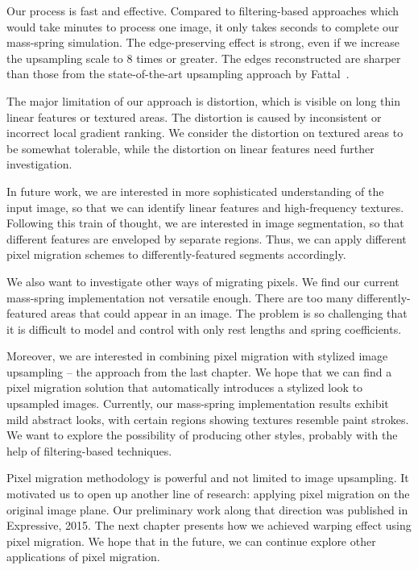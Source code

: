 Our process is fast and effective. Compared to filtering-based approaches which would take minutes to process one image, it only takes seconds to complete our mass-spring simulation. The edge-preserving effect is strong, even if we increase the upsampling scale to 8 times or greater. The edges reconstructed are sharper than those from the state-of-the-art upsampling approach by Fattal~\cite{FAT:EdgeStatistics}.

 The major limitation of our approach is distortion, which is visible on long thin linear features or textured areas. The distortion is caused by inconsistent or incorrect local gradient ranking. We consider the distortion on textured areas to be somewhat tolerable, while the distortion on linear features need further investigation. 
 
In future work, we are interested in more sophisticated understanding of the input image, so that we can identify linear features and high-frequency textures. Following this train of thought, we are interested in image segmentation, so that different features are enveloped by separate regions. Thus, we can apply different pixel migration schemes to differently-featured segments accordingly. 

We also want to investigate other ways of migrating pixels. We find our current mass-spring implementation not versatile enough. There are too many differently-featured areas that could appear in an image. The problem is so challenging that it is difficult to model and control with only rest lengths and spring coefficients. 

Moreover, we are interested in combining pixel migration with stylized image upsampling -- the approach from the last chapter. We hope that we can find a pixel migration solution that automatically introduces a stylized look to upsampled images. Currently, our mass-spring implementation results exhibit mild abstract looks, with certain regions showing textures resemble paint strokes. We want to explore the possibility of producing other styles, probably with the help of filtering-based techniques. 

Pixel migration methodology is powerful and not limited to image upsampling. It motivated us to open up another line of research: applying pixel migration on the original image plane. Our preliminary work along that direction was published in Expressive, 2015. The next chapter presents how we achieved warping effect using pixel migration. We hope that in the future, we can continue explore other applications of pixel migration.
